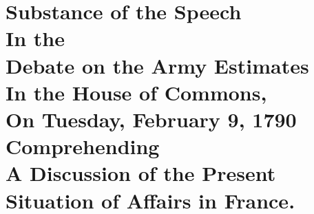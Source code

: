 


\chapter*[Substance of Speech on the Army Estimates]{
Substance of the Speech
\\{\small In the}
\\Debate on the Army Estimates
\\In the House of Commons,
\\{\small On Tuesday, February 9, 1790}
\\{\small Comprehending}
\\A Discussion of the Present Situation of Affairs in France.
}

